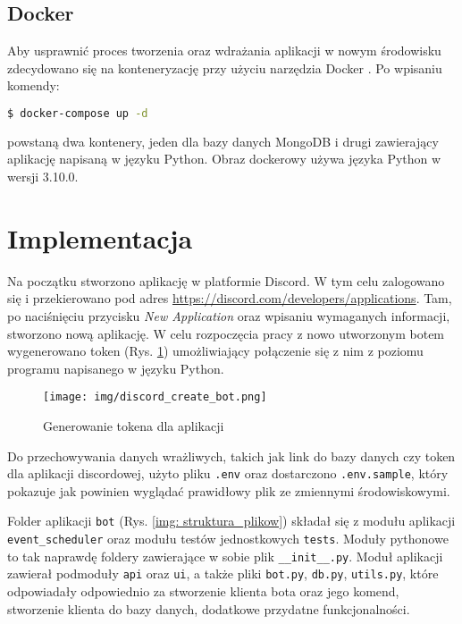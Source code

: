 \documentclass[11pt,a4paper]{article}
\begin{document}
\subsection{Docker}

Aby usprawnić proces tworzenia oraz wdrażania aplikacji w nowym środowisku zdecydowano się na konteneryzację przy użyciu narzędzia Docker \cite{DockerDocumentation}. Po wpisaniu komendy:
\begin{lstlisting}[language=Bash,caption={Uruchamianie aplikacji w kontenerze Docker},label={lst: docker}]
  $ docker-compose up -d
\end{lstlisting}
powstaną dwa kontenery, jeden dla bazy danych MongoDB i drugi zawierający aplikację napisaną w języku Python. Obraz dockerowy używa języka Python w wersji 3.10.0.


\section{Implementacja}

Na początku stworzono aplikację w platformie Discord. W tym celu zalogowano się i przekierowano pod adres \href{https://discord.com/developers/applications}{https://discord.com/developers/applications}. Tam, po naciśnięciu przycisku \textit{New Application} oraz wpisaniu wymaganych informacji, stworzono nową aplikację. W celu rozpoczęcia pracy z nowo utworzonym botem wygenerowano token (Rys. \ref{img: discord_gen_token}) umożliwiający połączenie się z nim z poziomu programu napisanego w języku Python.
\begin{figure}[H]
    \centering
    \texttt{[image: img/discord\_create\_bot.png]}
    \caption{Generowanie tokena dla aplikacji}
    \label{img: discord_gen_token}
\end{figure}

Do przechowywania danych wrażliwych, takich jak link do bazy danych czy token dla aplikacji discordowej, użyto pliku \texttt{.env} oraz dostarczono \texttt{.env.sample}, który pokazuje jak powinien wyglądać prawidłowy plik ze zmiennymi środowiskowymi. 

Folder aplikacji \texttt{bot} (Rys. \ref{img: struktura_plikow}) składał się z modułu aplikacji \texttt{event\_scheduler} oraz modułu testów jednostkowych \texttt{tests}. Moduły pythonowe to tak naprawdę foldery zawierające w sobie plik \texttt{\_\_init\_\_.py}. Moduł aplikacji zawierał podmoduły \texttt{api} oraz \texttt{ui}, a także pliki \texttt{bot.py}, \texttt{db.py}, \texttt{utils.py}, które odpowiadały odpowiednio za stworzenie klienta bota oraz jego komend, stworzenie klienta do bazy danych, dodatkowe przydatne funkcjonalności. 
\end{document}
